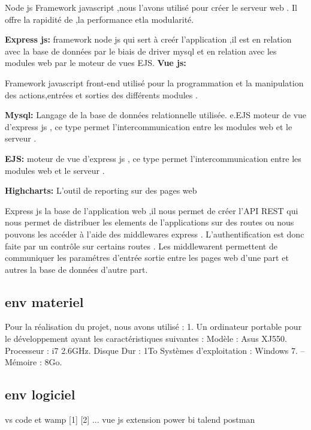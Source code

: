Node js
Framework javascript ,nous l'avons utilis\'{e} pour cr\'{e}er le serveur web .
Il offre la rapidit\'{e} de ,la performance etla modularit\'{e}.
\bigskip


\textbf{ Express js:}
framework node js qui sert \`{a} cre\'{e}r l'application ,il est en
relation avec la base de donn\'{e}es par le biais de driver mysql et en relation
avec les modules web par le moteur de vues EJS.
\bigskip
\textbf{ Vue js:}

Framework javascript front-end utilis\'{e} pour la programmation et la
manipulation des actions,entr\'{e}es et sorties des diff\'{e}rents modules .
\bigskip

\textbf{ Mysql:}
Langage de la base de donn\'{e}es relationnelle utilis\'{e}e.
e.EJS moteur de vue d'express js , ce type permet l'intercommunication entre
les modules web et le serveur .
\bigskip

\textbf{ EJS:}
moteur de vue d'express js , ce type permet l'intercommunication entre
les modules web et le serveur .
\bigskip


\textbf{ Highcharts: }
L'outil de \guillemotleft{} reporting \guillemotright{} sur des pages web
\bigskip





Express js la base de l'application web ,il nous permet de cr\'{e}er l'API REST
qui nous permet de distribuer les elements de l'applications sur des \guillemotleft{} routes \guillemotright{}
ou nous pouvons les acc\'{e}der \`{a} l'aide des middlewares express .
L'authentification est donc faite par un contr\^{o}le sur certains \guillemotleft{} routes \guillemotright{}.
Les middlewarent permettent de communiquer les param\'{e}tres d'entr\'{e}e sortie
entre les pages web d'une part et autres la base de donn\'{e}es d'autre part.

\newpage


\subsection{env materiel }
Pour la r\'{e}alisation du projet, nous avons utilis\'{e} :
1. Un ordinateur portable pour le d\'{e}veloppement ayant les caract\'{e}ristiques suivantes :
\textendash{} Mod\`{e}le : Asus XJ550.
\textendash{} Processeur : i7 2.6GHz.
\textendash{} Disque Dur : 1To
\textendash{} Syst\`{e}mes d'exploitation : Windows 7.
– M\'{e}moire : 8Go.


\subsection{env logiciel}
vs code et wamp [1] [2] ...
vue js extension
power bi
talend
postman




